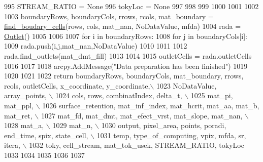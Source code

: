 \begin{DoxyCode}
{}
995     STREAM\_RATIO = \textcolor{keywordtype}{None}
996     tokyLoc = \textcolor{keywordtype}{None}
997 
998 
999 
1000 
1001 
1002 
1003   boundaryRows, boundaryCols, rrows, rcols, mat\_boundary = \hyperlink{namespacesmoderp2d_1_1src_1_1data__preparation_a32f7109b150f5af13b8087e8bb3213d2}{find\_boudary\_cells}(rows, cols,
       mat\_nan, NoDataValue, mfda)
1004   rada = \hyperlink{classsmoderp2d_1_1src_1_1data__preparation_1_1Outlet}{Outlet}()
1005 
1006 
1007   \textcolor{keywordflow}{for} i \textcolor{keywordflow}{in} boundaryRows:
1008     \textcolor{keywordflow}{for} j \textcolor{keywordflow}{in} boundaryCols[i]:
1009       rada.push(i,j,mat\_nan,NoDataValue)
1010 
1011 
1012   rada.find\_outlets(mat\_dmt\_fill)
1013 
1014 
1015   outletCells = rada.outletCells
1016 
1017 
1018   arcpy.AddMessage(\textcolor{stringliteral}{"Data preparation has been finished"})
1019 
1020 
1021 
1022   \textcolor{keywordflow}{return} boundaryRows, boundaryCols, mat\_boundary, rrows, rcols, outletCells, x\_coordinate, y\_coordinate,\(\backslash\)
1023     NoDataValue, array\_points, \(\backslash\)
1024     cols, rows, combinatIndex, delta\_t, \(\backslash\)
1025     mat\_pi, mat\_ppl, \(\backslash\)
1026     surface\_retention, mat\_inf\_index, mat\_hcrit, mat\_aa, mat\_b, mat\_ret, \(\backslash\)
1027     mat\_fd, mat\_dmt, mat\_efect\_vrst, mat\_slope, mat\_nan, \(\backslash\)
1028     mat\_a,   \(\backslash\)
1029     mat\_n,   \(\backslash\)
1030     output, pixel\_area, points, poradi,  end\_time, spix, state\_cell, \(\backslash\)
1031     temp, type\_of\_computing, vpix, mfda, sr, itera,  \(\backslash\)
1032     toky, cell\_stream, mat\_tok\_usek, STREAM\_RATIO, tokyLoc
1033 
1034 
1035 
1036 
1037 
\end{DoxyCode}
